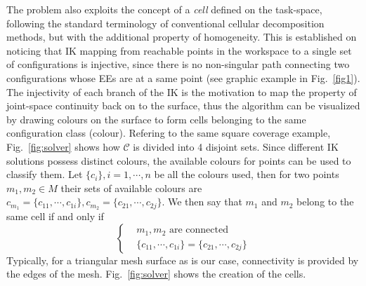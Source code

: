 \documentclass[journal]{IEEEtran}
\begin{document}
The problem also exploits the concept of a \textit{cell} defined on the task-space, following the standard terminology 
of conventional cellular decomposition methods, but with the additional property of homogeneity. 
This is established on noticing that IK mapping from reachable points in the workspace to a single set of configurations is injective, since there is no non-singular path connecting two configurations whose EEs are at a same point (see graphic example in Fig.~\ref{fig1}). 
The injectivity of each branch of the IK is the motivation to map the property of joint-space continuity back on to the surface, thus the algorithm can be visualized by drawing colours on the surface to form cells belonging to the same configuration class (colour).  
Refering to the same square coverage example, Fig.~\ref{fig:solver} shows how $\mathscr{C}$ is divided into 4 disjoint sets. 
Since different IK solutions possess distinct colours, the available colours for points can be used to classify them. Let $\{c_i\}, i = 1, \cdots, n$ be all the colours used, then for two points $m_1, m_2\in M$ their sets of available colours are $c_{m_1} = \{c_{11}, \cdots, c_{1i}\}, c_{m_2} = \{c_{21}, \cdots, c_{2j}\}$. We then say that $m_1$ and $m_2$ belong to the same cell if and only if 
$$\left\{
\begin{aligned}
& m_1,m_2 \mbox{ are connected}\\ %
& \{c_{11}, \cdots, c_{1i}\} = \{c_{21}, \cdots, c_{2j}\}
\end{aligned}
\right.
$$
Typically, for a triangular mesh surface as is our case, connectivity is provided by the edges of the mesh. Fig.~\ref{fig:solver} shows the creation of the cells. 
\end{document}
